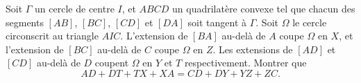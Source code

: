 Soit $\Gamma$ un cercle de centre $I$, et $ABCD$ un quadrilatère convexe tel que chacun des segments
$[AB]$, $[BC]$, $[CD]$ et $[DA]$ soit tangent à $\Gamma$. Soit $\Omega$ le cercle circonscrit au triangle $AIC$.
L'extension de $[BA]$ au-delà de $A$ coupe $\Omega$ en $X$, et l'extension de $[BC]$ au-delà de $C$ coupe $\Omega$ en $Z$.
Les extensions de $[AD]$ et $[CD]$ au-delà de $D$ coupent $\Omega$ en $Y$ et $T$ respectivement. Montrer que
\[
AD + DT + TX + XA = CD + DY + YZ + ZC.
\]
